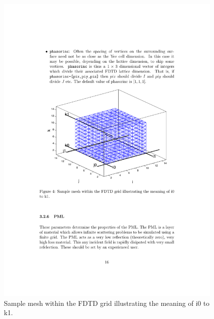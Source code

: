 \documentclass[a4paper, 12pt]{article}
\begin{document}
\begin{itemize}
		\begin{figure}[h]
			\begin{center}
				\includegraphics[width=\textwidth]{figures/3.pdf}
				\caption{Sample mesh within the FDTD grid illustrating the meaning of
					i0 to k1.}
				\label{fig:phasesurf}
			\end{center}
		\end{figure}
		
		
	\end{itemize}
\end{document}
